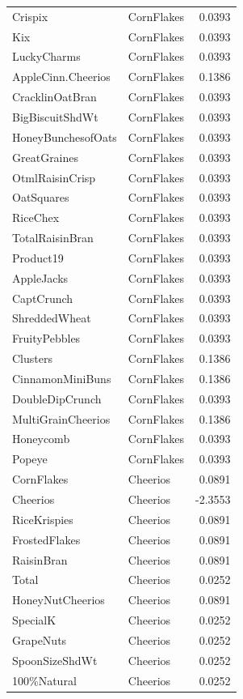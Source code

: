 \begin{longtable}{llr}
Crispix & CornFlakes & 0.0393 \\
Kix & CornFlakes & 0.0393 \\
LuckyCharms & CornFlakes & 0.0393 \\
AppleCinn.Cheerios & CornFlakes & 0.1386 \\
CracklinOatBran & CornFlakes & 0.0393 \\
BigBiscuitShdWt & CornFlakes & 0.0393 \\
HoneyBunchesofOats & CornFlakes & 0.0393 \\
GreatGraines & CornFlakes & 0.0393 \\
OtmlRaisinCrisp & CornFlakes & 0.0393 \\
OatSquares & CornFlakes & 0.0393 \\
RiceChex & CornFlakes & 0.0393 \\
TotalRaisinBran & CornFlakes & 0.0393 \\
Product19 & CornFlakes & 0.0393 \\
AppleJacks & CornFlakes & 0.0393 \\
CaptCrunch & CornFlakes & 0.0393 \\
ShreddedWheat & CornFlakes & 0.0393 \\
FruityPebbles & CornFlakes & 0.0393 \\
Clusters & CornFlakes & 0.1386 \\
CinnamonMiniBuns & CornFlakes & 0.1386 \\
DoubleDipCrunch & CornFlakes & 0.0393 \\
MultiGrainCheerios & CornFlakes & 0.1386 \\
Honeycomb & CornFlakes & 0.0393 \\
Popeye & CornFlakes & 0.0393 \\
CornFlakes & Cheerios & 0.0891 \\
Cheerios & Cheerios & -2.3553 \\
RiceKrispies & Cheerios & 0.0891 \\
FrostedFlakes & Cheerios & 0.0891 \\
RaisinBran & Cheerios & 0.0891 \\
Total & Cheerios & 0.0252 \\
HoneyNutCheerios & Cheerios & 0.0891 \\
SpecialK & Cheerios & 0.0252 \\
GrapeNuts & Cheerios & 0.0252 \\
SpoonSizeShdWt & Cheerios & 0.0252 \\
100\%Natural & Cheerios & 0.0252 \\

\end{longtable}
